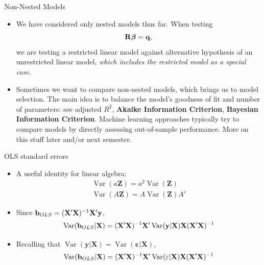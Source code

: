 \begin{frame}{Non-Nested Models}
\begin{itemize}
	\item We have considered only nested models thus far. When testing \[
	{\bf R} \boldsymbol{\beta} = {\bf q}, 
	\]
	we are testing a restricted linear model against alternative hypothesis of 
	an unrestricted linear model, \emph{ which includes the restricted model as a special
	case}.

	\medskip
	\item Sometimes we want to compare non-nested models, which brings us to
	model selection. The main idea
	is to balance the model's goodness of fit and number of parameters: see
	adjusted $R^2$, {\bf Akaike Information Criterion}, {\bf Bayesian
	Information Criterion}. Machine learning approaches typically
	try to compare models by directly assessing out-of-sample performance.
	 More on this stuff later and/or next semester.

\end{itemize}
\end{frame}


\begin{frame}{OLS standard errors}
\begin{itemize}
	\item A useful identity for linear algebra:
\begin{align*}
\operatorname { Var } (a \mathbf{Z} ) = a^2 \operatorname { Var }(\mathbf{Z})\\
\operatorname { Var } (A \mathbf{Z} ) = A \operatorname { Var }(\mathbf{Z}) A'
\end{align*}

\smallskip
\item Since ${\bf b}_{OLS} = ({\bf X} '{\bf X} )^{-1} {\bf X} '{\bf y}$,
\[
\operatorname { Var } ({\bf b}_{OLS} | {\bf X}) = ({\bf X} '{\bf X} )^{-1} {\bf X}' \operatorname { Var } ({\bf y} | {\bf X})  {\bf X}  ({\bf X} '{\bf X} )^{-1}
\]

\smallskip
\item Recalling that $\operatorname { Var } ( \mathbf{y} |\mathbf{X} )  = \operatorname { Var } ( \mathbf{\varepsilon} | \mathbf { X } ) $,
\[
\operatorname { Var } ({\bf b}_{OLS} | {\bf X}) = ({\bf X} '{\bf X} )^{-1} {\bf X}' \operatorname { Var } ( \mathbf{\varepsilon} | \mathbf { X } )  {\bf X}  ({\bf X} '{\bf X} )^{-1}
\]
\end{itemize}
\end{frame}


